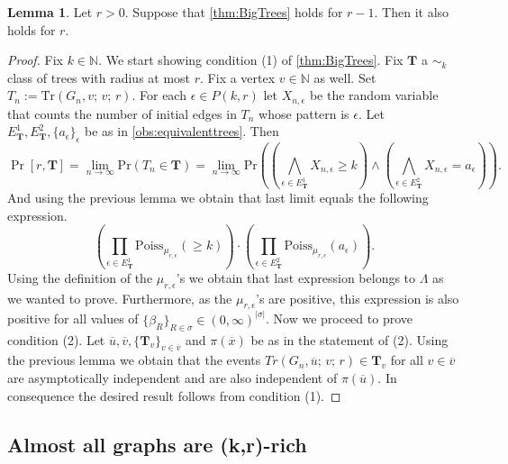 \documentclass[12pt,notitlepage,a4paper]{article}
\theoremstyle{definition}
\newtheorem{lemma}{Lemma}[section]
\newcommand{\N}{\mathbb{N}}
\newcommand{\Ln}{\lim\limits_{n\to \infty}}
\newcommand{\Tr}{\mathrm{Tr}}
\newcommand{\sep}{\noindent\rule{2cm}{0.4pt}}
\begin{document}
\begin{lemma} \label{lem:singletreeprob}
Let $r>0$. Suppose that \cref{thm:BigTrees}
holds for $r-1$. Then it also holds for $r$. 
\end{lemma}
\begin{proof}
Fix $k\in \N$. 
We start showing condition (1) of \cref{thm:BigTrees}.
Fix $\mathbf{T}$ a $\sim_k$ class of trees with radius at most $r$. 
Fix a vertex $v\in \N$ as well. Set $T_n:=\Tr(G_n,v;\,v;\,r)$.
For each $\epsilon\in P(k,r)$ let
$X_{n,\epsilon}$ be the random 
variable that counts the number
of initial edges in $T_n$ whose pattern is 
$\epsilon$. Let $E^1_\mathbf{T}, E^2_\mathbf{T}, 
\{a_\epsilon\}_\epsilon$ be as in \cref{obs:equivalenttrees}.
Then
\[
\Pr[r,\mathbf{T}]=
\Ln 
\mathrm{Pr}(T_n\in \mathbf{T})
=
\Ln
\mathrm{Pr}\left(
\left(
\bigwedge_{\epsilon\in E^1_\mathbf{T}}
X_{n,\epsilon}\geq k
\right) \wedge
\left(
\bigwedge_{\epsilon\in E^2_\mathbf{T}}
X_{n,\epsilon}= a_\epsilon
\right)
\right).
\]
And using the previous lemma we obtain that last limit
equals the following expression.
\[ 
\left(
\prod_{\epsilon\in E^1_\mathbf{T}}
\mathrm{Poiss}_{\mu_{r,\epsilon}}(\geq k ) 
\right)\cdot
\left(
\prod_{\epsilon\in E^2_\mathbf{T}}
\mathrm{Poiss}_{\mu_{r,\epsilon}}(a_\epsilon) 
\right).
\]
Using the definition of 
the $\mu_{r,\epsilon}$'s we obtain that last expression
belongs to $\Lambda$ as we wanted to prove. Furthermore,
as the $\mu_{r,\epsilon}$'s are positive, this expression is also 
positive for all values of
$\{\beta_R\}_{R\in \sigma}\in (0,\infty)^{|\sigma|}$.
Now we proceed to prove condition (2). 
Let $\overline{u},\overline{v}, \{\mathbf{T}_v\}_{v\in \overline{v}}$
and $\pi(\overline{x})$ be as in the statement of (2). 
Using the previous lemma we obtain that the events
$Tr(G_n,\overline{u};\, v;\, r)\in \mathbf{T}_v$ for all $v\in \overline{v}$
are asymptotically independent and are also independent of $\pi(\overline{u})$. 
In consequence the desired result follows from condition (1). 
\end{proof}

\subsection{Almost all graphs are (k,r)-rich}
\end{document}
